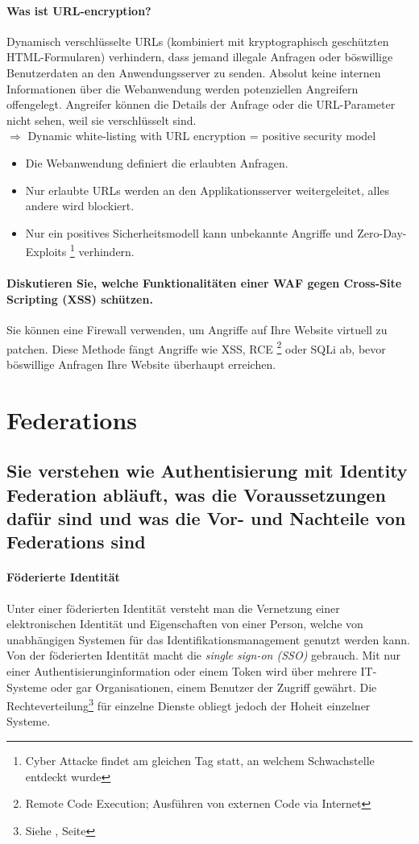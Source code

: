 \documentclass[10pt,a4paper]{article}
\begin{document}
\paragraph*{Was ist URL-encryption?}Dynamisch verschlüsselte URLs (kombiniert mit kryptographisch geschützten HTML-Formularen) verhindern, dass jemand
illegale Anfragen oder böswillige Benutzerdaten an den Anwendungsserver zu senden. Absolut keine internen Informationen über die Webanwendung werden potenziellen Angreifern offengelegt. Angreifer können die
Details der Anfrage oder die URL-Parameter nicht sehen, weil sie verschlüsselt sind.
\\
$\Rightarrow$ Dynamic white-listing with URL encryption = positive security model
\begin{itemize}[noitemsep,topsep=0pt,leftmargin=*]
    \item Die Webanwendung definiert die erlaubten Anfragen.
    \item Nur erlaubte URLs werden an den Applikationsserver weitergeleitet, alles andere wird blockiert.
    \item Nur ein positives Sicherheitsmodell kann unbekannte Angriffe und Zero-Day-Exploits \footnote{Cyber Attacke findet am gleichen Tag statt, an welchem Schwachstelle entdeckt wurde} verhindern.
\end{itemize}

\paragraph*{Diskutieren Sie, welche Funktionalitäten einer WAF gegen Cross-Site Scripting (XSS) schützen.} Sie können eine Firewall verwenden, um Angriffe auf Ihre Website virtuell zu patchen. Diese Methode fängt Angriffe wie XSS, RCE \footnote{Remote Code Execution; Ausführen von externen Code via Internet} oder SQLi ab, bevor böswillige Anfragen Ihre Website überhaupt erreichen.

\pagebreak
\section{Federations}
\subsection*{Sie verstehen wie Authentisierung mit Identity Federation abläuft, was die Voraussetzungen dafür sind und was die Vor- und Nachteile von Federations sind}
\paragraph*{Föderierte Identität}Unter einer föderierten Identität versteht man die Vernetzung einer elektronischen Identität und Eigenschaften von einer Person, welche von unabhängigen Systemen für das Identifikationsmanagement genutzt werden kann. Von der föderierten Identität macht die \textsl{single sign-on (SSO)} gebrauch. Mit nur einer Authentisierunginformation oder einem Token wird über mehrere IT-Systeme oder gar Organisationen, einem Benutzer der Zugriff gewährt. Die Rechteverteilung\footnote{{Siehe \underline{}, Seite \pageref{para:Autorisierung}}} für einzelne Dienste obliegt jedoch der Hoheit einzelner Systeme.
\end{document}
